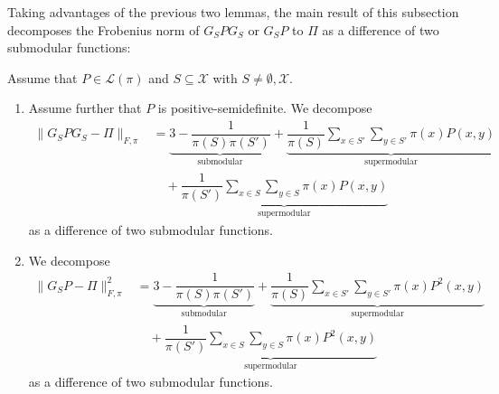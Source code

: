 \documentclass[EJP]{ejpecp} %
\begin{document}
Taking advantages of the previous two lemmas, the main result of this subsection decomposes the Frobenius norm of $G_S P G_S$ or $G_S P$ to $\Pi$ as a difference of two submodular functions:
\begin{proposition}\label{prop:GPGFdecompose}
    Assume that $P \in \mathcal{L}(\pi)$ and $S \subseteq \mathcal{X}$ with $S \neq \emptyset,\mathcal{X}$.
    \begin{enumerate}
        \item\label{it:GPGdecompose} Assume further that $P$ is positive-semidefinite. We decompose
        \begin{align*}
            \|G_SPG_S - \Pi\|_{F, \pi} &= \underbrace{3 - \dfrac{1}{\pi(S)\pi(S')}}_{\text{submodular}} + \underbrace{\dfrac{1}{\pi(S)} \sum_{x \in S'} \sum_{y \in S'} \pi(x) P(x,y)}_{\text{supermodular}} \\
            &\quad + \underbrace{\dfrac{1}{\pi(S')} \sum_{x \in S} \sum_{y \in S} \pi(x) P(x,y)}_{\text{supermodular}}
        \end{align*}
        as a difference of two submodular functions.

        \item\label{it:GPdecompose} We decompose
        \begin{align*}
            \|G_SP - \Pi\|_{F, \pi}^2 &= \underbrace{3 - \dfrac{1}{\pi(S)\pi(S')}}_{\text{submodular}} + \underbrace{\dfrac{1}{\pi(S)} \sum_{x \in S'} \sum_{y \in S'} \pi(x) P^2(x,y)}_{\text{supermodular}} \\
            &\quad + \underbrace{\dfrac{1}{\pi(S')} \sum_{x \in S} \sum_{y \in S} \pi(x) P^2(x,y)}_{\text{supermodular}}
        \end{align*}
        as a difference of two submodular functions.
    \end{enumerate}
\end{proposition}
\end{document}
